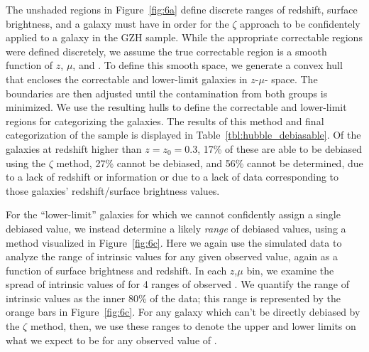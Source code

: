 \documentclass[twocolumn]{aastex6}
\begin{document}
The unshaded regions in Figure~\ref{fig:6a} define discrete ranges of redshift, surface brightness, and \pfeatures{} a galaxy must have in order for the $\zeta$ approach to be confidentely applied to a galaxy in the GZH sample. While the appropriate correctable regions were defined discretely, we assume the true correctable region is a smooth function of $z$, $\mu$, and \pfeatures{}. To define this smooth space, we generate a convex hull that encloses the correctable and lower-limit \ferengi{} galaxies in $z$-$\mu$-\pfeatures{} space. The boundaries are then adjusted until the contamination from both groups is minimized. We use the resulting hulls to define the correctable and lower-limit regions for categorizing the \hst{} galaxies. The results of this method and final categorization of the \hst{} sample is displayed in Table~\ref{tbl:hubble_debiasable}. Of the galaxies at redshift higher than $z=z_{0}=0.3$, 17\% of these are able to be debiased using the $\zeta$ method, 27\% cannot be debiased, and 56\% cannot be determined, due to a lack of redshift or information or due to a lack of \ferengi{} data corresponding to those galaxies' redshift/surface brightness values.

For the ``lower-limit'' galaxies for which we cannot confidently assign a single debiased \pfeatures{} value, we instead determine a likely \emph{range} of debiased values, using a method visualized in Figure~\ref{fig:6c}. Here we again use the \ferengi{} simulated data to analyze the range of intrinsic \pfeaturesrest{} values for any given observed \pfeatures{} value, again as a function of surface brightness and redshift. In each $z$,$\mu$ bin, we examine the spread of intrinsic values of \pfeaturesrest{} for 4 ranges of observed \pfeatures. We quantify the range of intrinsic values as the inner 80\% of the data; this range is represented by the orange bars in Figure~\ref{fig:6c}. For any galaxy which can't be directly debiased by the $\zeta$ method, then, we use these ranges to denote the upper and lower limits on what we expect \pfeaturesrest{} to be for any observed value of \pfeatures. 
\end{document}
